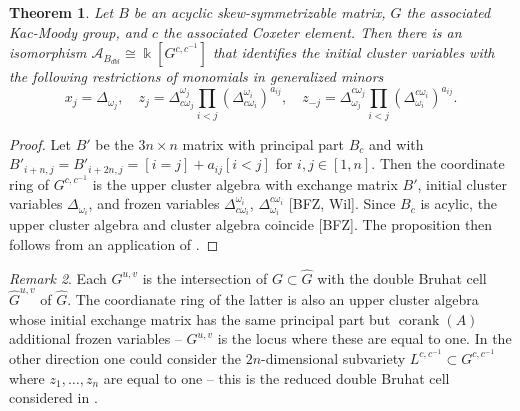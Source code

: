 \documentclass[12pt]{amsart}
\newcommand{\cA}{\mathcal{A}}
\newcommand{\kk}{\Bbbk}%
\DeclareMathOperator{\corank}{corank}
\newtheorem{theorem}{Theorem}[section]
\theoremstyle{remark}
\newtheorem{remark}[theorem]{Remark}
\numberwithin{equation}{section}
\begin{document}

\begin{theorem}
  \label{thm:coordring}
Let $B$ be an acyclic skew-symmetrizable matrix, $G$ the associated Kac-Moody group, and $c$ the associated Coxeter element. 
Then there is an isomorphism $\cA_{B_{dbl}} \cong \kk[G^{c,c^{-1}}]$ that identifies the initial cluster variables with the following restrictions of monomials in generalized minors
\begin{equation}\label{eq:initialcluster}
x_j = \Delta_{\omega_j},\quad z_j = \Delta^{\omega_j}_{ c\omega_j} \prod_{i < j}(\Delta^{\omega_i}_{c \omega_i})^{a_{ij}},\quad z_{-j} = \Delta^{c \omega_j}_{\omega_j} \prod_{i < j}(\Delta^{c \omega_i}_{\omega_i})^{a_{ij}}.
\end{equation}
\end{theorem}
\begin{proof}
Let $B'$ be the $3n \times n$ matrix with principal part $B_c$ and with $B'_{i+n,j} = B'_{i+2n,j} = [i = j] + a_{ij}[i < j]$ for $i,j \in [1,n]$.  Then the coordinate ring of $G^{c,c^{-1}}$ is the upper cluster algebra with exchange matrix $B'$, initial cluster variables $\Delta_{\omega_i}$, and frozen variables $\Delta^{\omega_i}_{c \omega_i}$, $\Delta^{c \omega_i}_{\omega_i}$ [BFZ, Wil]. Since $B_c$ is acylic, the upper cluster algebra and cluster algebra coincide [BFZ]. The proposition then follows from an application of .
\end{proof}

\begin{remark}
Each $G^{u,v}$ is the intersection of $G \subset \widehat{G}$ with the double Bruhat cell $\widehat{G}^{u,v}$ of $\widehat{G}$. The coordianate ring of the latter is also an upper cluster algebra whose initial exchange matrix has the same principal part but $\corank(A)$ additional frozen variables -- $G^{u,v}$ is the locus where these are equal to one. In the other direction one could consider the $2n$-dimensional subvariety $L^{c,c^{-1}} \subset G^{c,c^{-1}}$ where $z_1,\dotsc,z_n$ are equal to one -- this is the reduced double Bruhat cell considered in \cite{YZ08}.
\end{remark}
\end{document}
